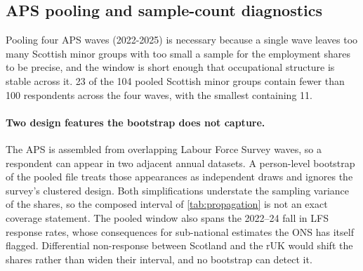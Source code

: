 
\subsection{APS pooling and sample-count diagnostics}

Pooling four APS waves (2022-2025) is necessary because a single wave leaves too many Scottish minor groups with too small a sample for the employment shares to be precise, and the window is short enough that occupational structure is stable across it. 23 of the 104 pooled Scottish minor groups contain fewer than 100 respondents across the four waves, with the smallest containing 11. 

 
\paragraph{Two design features the bootstrap does not capture.} The APS is
assembled from overlapping Labour Force Survey waves, so a respondent can
appear in two adjacent annual datasets. A person-level bootstrap of the pooled
file treats those appearances as independent draws and ignores the survey's
clustered design. Both simplifications understate the sampling variance of the
shares, so the composed interval of \cref{tab:propagation} is not an exact
coverage statement. The pooled window also spans the 2022--24 fall in LFS
response rates, whose consequences for sub-national estimates the ONS has
itself flagged. Differential non-response between Scotland and the rUK would
shift the shares rather than widen their interval, and no bootstrap can detect
it.

